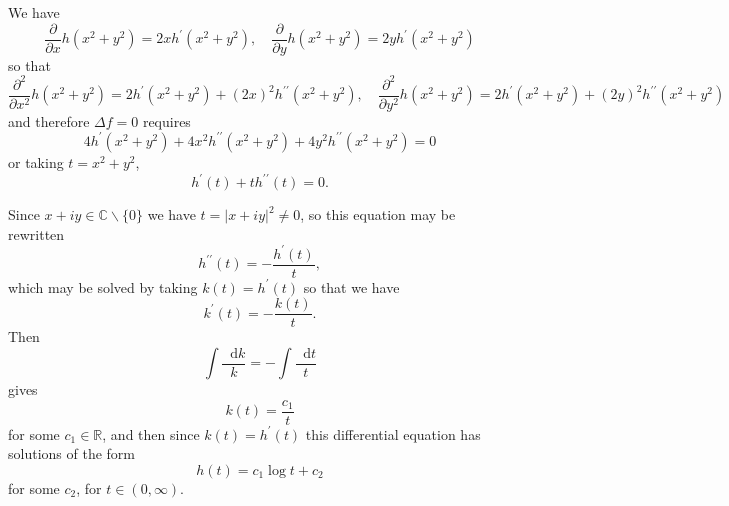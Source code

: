 \documentclass{article}
\newcommand\dif{\mathop{}\!\mathrm{d}}
\begin{document}
\begin{Answer}
We have
$$
\frac{\partial}{\partial x} h(x^2 + y^2) = 2x h^\prime(x^2 + y^2), \quad
\frac{\partial}{\partial y} h(x^2 + y^2) = 2y h^\prime(x^2 + y^2)
$$
so that
$$
  \frac{\partial^2}{\partial x^2} h(x^2 + y^2) 
= 2 h^\prime(x^2 + y^2) + (2x)^2 h^{\prime\prime}(x^2 + y^2), \quad
  \frac{\partial^2}{\partial y^2} h(x^2 + y^2)
= 2 h^\prime(x^2 + y^2) + (2y)^2 h^{\prime\prime}(x^2 + y^2)
$$
and therefore $\Delta f = 0$ requires
$$
  4 h^\prime (x^2 + y^2) 
+ 4x^2 h^{\prime\prime}(x^2 + y^2) 
+ 4y^2 h^{\prime\prime}(x^2 + y^2) = 0
$$
or taking $t = x^2 + y^2$,
$$
h^\prime(t) + t h^{\prime\prime}(t) = 0.
$$

Since 
$x + i y \in \mathbb{C} \backslash \{ 0 \}$ we have
$t = |x + iy|^2 \neq 0$,
so this equation may be rewritten
$$
h^{\prime\prime}(t) = -\frac{h^\prime(t)}{t},
$$
which may be solved by taking $k(t) = h^\prime(t)$ so that
we have
$$
k^\prime(t) = -\frac{k(t)}{t}.
$$
Then
$$
\int \frac{\dif k}{k} = -\int \frac{\dif t}{t} 
$$
gives
$$
k(t) = \frac{c_1}{t}
$$
for some $c_1 \in \mathbb{R}$, and then since $k(t) = h^\prime(t)$
this differential equation has solutions of the form
$$
h(t) = c_1 \log t + c_2
$$ 
for some $c_2$, for $t \in (0, \infty)$.
\end{Answer}
\end{document}
